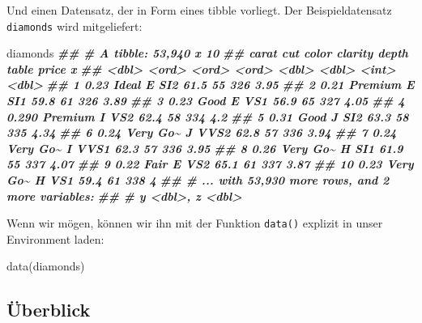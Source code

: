 \documentclass[11pt,german,a4paper]{article}
\newenvironment{Shaded}{\begin{snugshade}}{\end{snugshade}}
\newcommand{\DocumentationTok}[1]{\textcolor[rgb]{0.56,0.35,0.01}{\textbf{\textit{#1}}}}
\newcommand{\FunctionTok}[1]{\textcolor[rgb]{0.00,0.00,0.00}{#1}}
\newcommand{\NormalTok}[1]{#1}
\begin{document}
Und einen Datensatz, der in Form eines tibble vorliegt. Der Beispieldatensatz \texttt{diamonds} wird mitgeliefert:

\begin{Shaded}
\begin{Highlighting}[]
\NormalTok{diamonds}
\DocumentationTok{\#\# \# A tibble: 53,940 x 10}
\DocumentationTok{\#\#    carat cut      color clarity depth table price     x}
\DocumentationTok{\#\#    \textless{}dbl\textgreater{} \textless{}ord\textgreater{}    \textless{}ord\textgreater{} \textless{}ord\textgreater{}   \textless{}dbl\textgreater{} \textless{}dbl\textgreater{} \textless{}int\textgreater{} \textless{}dbl\textgreater{}}
\DocumentationTok{\#\#  1 0.23  Ideal    E     SI2      61.5    55   326  3.95}
\DocumentationTok{\#\#  2 0.21  Premium  E     SI1      59.8    61   326  3.89}
\DocumentationTok{\#\#  3 0.23  Good     E     VS1      56.9    65   327  4.05}
\DocumentationTok{\#\#  4 0.290 Premium  I     VS2      62.4    58   334  4.2 }
\DocumentationTok{\#\#  5 0.31  Good     J     SI2      63.3    58   335  4.34}
\DocumentationTok{\#\#  6 0.24  Very Go\textasciitilde{} J     VVS2     62.8    57   336  3.94}
\DocumentationTok{\#\#  7 0.24  Very Go\textasciitilde{} I     VVS1     62.3    57   336  3.95}
\DocumentationTok{\#\#  8 0.26  Very Go\textasciitilde{} H     SI1      61.9    55   337  4.07}
\DocumentationTok{\#\#  9 0.22  Fair     E     VS2      65.1    61   337  3.87}
\DocumentationTok{\#\# 10 0.23  Very Go\textasciitilde{} H     VS1      59.4    61   338  4   }
\DocumentationTok{\#\# \# ... with 53,930 more rows, and 2 more variables:}
\DocumentationTok{\#\# \#   y \textless{}dbl\textgreater{}, z \textless{}dbl\textgreater{}}
\end{Highlighting}
\end{Shaded}

Wenn wir mögen, können wir ihn mit der Funktion \texttt{data()} explizit in unser Environment laden:

\begin{Shaded}
\begin{Highlighting}[]
\FunctionTok{data}\NormalTok{(diamonds)}
\end{Highlighting}
\end{Shaded}

\hypertarget{uxfcberblick-1}{%
\subsection*{Überblick}\label{uxfcberblick-1}}
\end{document}
